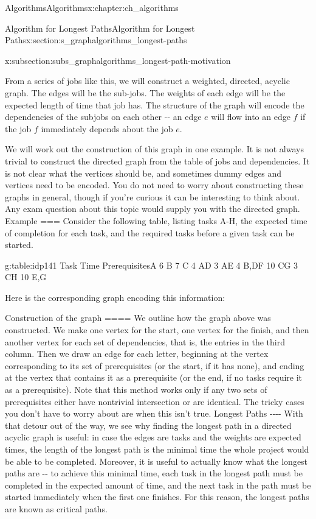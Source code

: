 \documentclass[oneside,10pt,]{book}
\numberwithin{equation}{section}
\begin{document}
\begin{chapterptx}{Algorithms}{}{Algorithms}{}{}{x:chapter:ch_algorithms}
\begin{sectionptx}{Algorithm for Longest Paths}{}{Algorithm for Longest Paths}{}{}{x:section:s_graphalgorithms_longest-paths}
\begin{subsectionptx}{}{}{}{}{}{x:subsection:subs_graphalgorithms_longest-path-motivation}
\par
From a series of jobs like this, we will construct a weighted, directed, acyclic graph.  The edges will be the sub-jobs. The weights of each edge will be the expected length of time that job has.  The structure of the graph will encode the dependencies of the subjobs on each other -{}-{} an edge \(e\) will flow into an edge \(f\) if the job \(f\) immediately depends about the job \(e\).%
\par
We will work out the construction of this graph in one example.  It is not always trivial to construct the directed graph from the table of jobs and dependencies.  It is not clear what the vertices should be, and sometimes dummy edges and vertices need to be encoded.  You do not need to worry about constructing these graphs in general, though if you're curious it can be interesting to think about.  Any exam question about this topic would supply you with the directed graph.%
 Example === Consider the following table, listing tasks \textdollar{}\textdollar{}A-H\textdollar{}\textdollar{}, the expected time of completion for each task, and the required tasks before a given task can be started. \begin{tableptx}{\textbf{}}{g:table:idp141}{}%
Task Time PrerequisitesA 6 B 7 C 4 AD 3 AE 4 B,DF 10 CG 3 CH 10 E,G\end{tableptx}%
 Here is the corresponding graph encoding this information: \begin{image}{0}{1}{0}%
\end{image}%
 Construction of the graph ==== We outline how the graph above was constructed.  We make one vertex for the start, one vertex for the finish, and then another vertex for each set of dependencies, that is, the entries in the third column.  Then we draw an edge for each letter, beginning at the vertex corresponding to its set of prerequisites (or the start, if it has none), and ending at the vertex that contains it as a prerequisite (or the end, if no tasks require it as a prerequisite). Note that this method works only if any two sets of prerequisites either have nontrivial intersection or are identical.  The tricky cases you don't have to worry about are when this isn't true. Longest Paths -{}-{}-{}-{} With that detour out of the way, we see why finding the longest path in a directed acyclic graph is useful: in case the edges are tasks and the weights are expected times, the length of the longest path is the minimal time the whole project would be able to be completed. Moreover, it is useful to actually know what the longest paths are -{}-{} to achieve this minimal time, each task in the longest path must be completed in the expected amount of time, and the next task in the path must be started immediately when the first one finishes.  For this reason, the longest paths are known as \textasteriskcentered{}critical paths\textasteriskcentered{}.\end{subsectionptx}

\end{sectionptx}
\end{chapterptx}
\end{document}
